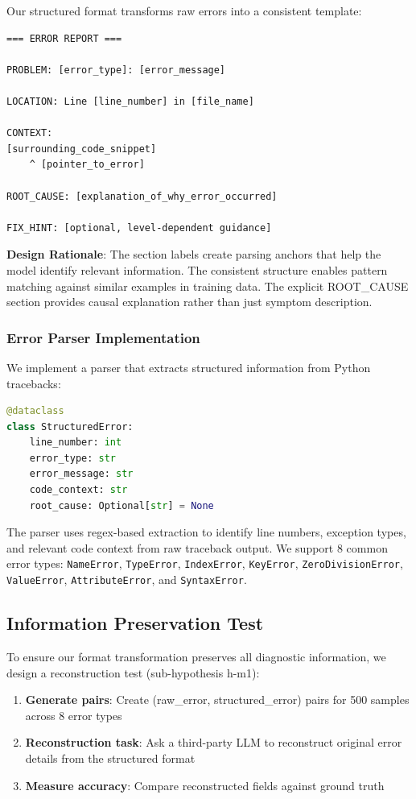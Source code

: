 Our structured format transforms raw errors into a consistent template:

\begin{lstlisting}
=== ERROR REPORT ===

PROBLEM: [error_type]: [error_message]

LOCATION: Line [line_number] in [file_name]

CONTEXT:
[surrounding_code_snippet]
    ^ [pointer_to_error]

ROOT_CAUSE: [explanation_of_why_error_occurred]

FIX_HINT: [optional, level-dependent guidance]
\end{lstlisting}

\textbf{Design Rationale}: The section labels create parsing anchors that help the model identify relevant information. The consistent structure enables pattern matching against similar examples in training data. The explicit ROOT\_CAUSE section provides causal explanation rather than just symptom description.

\subsubsection{Error Parser Implementation}

We implement a parser that extracts structured information from Python tracebacks:

\begin{lstlisting}[language=Python]
@dataclass
class StructuredError:
    line_number: int
    error_type: str
    error_message: str
    code_context: str
    root_cause: Optional[str] = None
\end{lstlisting}

The parser uses regex-based extraction to identify line numbers, exception types, and relevant code context from raw traceback output. We support 8 common error types: \texttt{NameError}, \texttt{TypeError}, \texttt{IndexError}, \texttt{KeyError}, \texttt{ZeroDivisionError}, \texttt{ValueError}, \texttt{AttributeError}, and \texttt{SyntaxError}.

\subsection{Information Preservation Test}

To ensure our format transformation preserves all diagnostic information, we design a reconstruction test (sub-hypothesis h-m1):

\begin{enumerate}
    \item \textbf{Generate pairs}: Create (raw\_error, structured\_error) pairs for 500 samples across 8 error types
    \item \textbf{Reconstruction task}: Ask a third-party LLM to reconstruct original error details from the structured format
    \item \textbf{Measure accuracy}: Compare reconstructed fields against ground truth
\end{enumerate}

